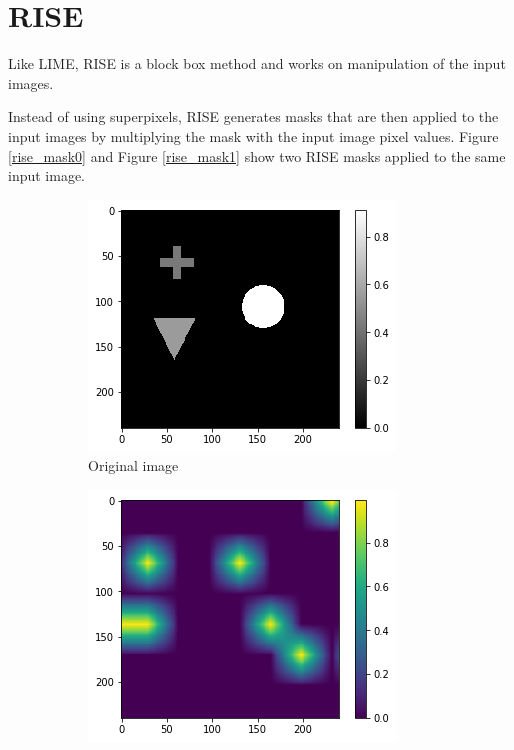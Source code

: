 \section{RISE}

Like LIME, RISE\cite{Petsiuk2018rise} is a block box method and works on manipulation of the input images.

Instead of using superpixels, RISE generates masks that are then applied to the input images by multiplying the mask with the input image pixel values. Figure \ref{rise_mask0} and Figure \ref{rise_mask1} show two RISE masks applied to the same input image.

\begin{figure}[H]
    \centering
    \begin{subfigure}[t]{.32\textwidth}
        \centering
        \includegraphics[width=\linewidth]{chapters/02_methods/images/rise/rise_original.png}
        \caption{Original image}
    \end{subfigure}\hfill%
    \begin{subfigure}[t]{.32\textwidth}
        \centering
        \includegraphics[width=\linewidth]{chapters/02_methods/images/rise/rise0_mask.png}

\end{subfigure}
\end{figure}
